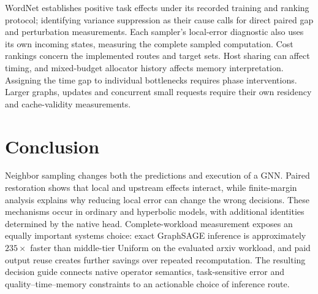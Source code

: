 \documentclass[sigconf, nonacm]{acmart}
\begin{document}
WordNet establishes positive task effects under its recorded training and ranking protocol; identifying variance suppression as their cause calls for direct paired gap and perturbation measurements. Each sampler's local-error diagnostic also uses its own incoming states, measuring the complete sampled computation. Cost rankings concern the implemented routes and target sets. Host sharing can affect timing, and mixed-budget allocator history affects memory interpretation. Assigning the time gap to individual bottlenecks requires phase interventions. Larger graphs, updates and concurrent small requests require their own residency and cache-validity measurements.

\section{Conclusion}
Neighbor sampling changes both the predictions and execution of a GNN. Paired restoration shows that local and upstream effects interact, while finite-margin analysis explains why reducing local error can change the wrong decisions. These mechanisms occur in ordinary and hyperbolic models, with additional identities determined by the native head. Complete-workload measurement exposes an equally important systems choice: exact GraphSAGE inference is approximately $235\times$ faster than middle-tier Uniform on the evaluated arxiv workload, and paid output reuse creates further savings over repeated recomputation. The resulting decision guide connects native operator semantics, task-sensitive error and quality--time--memory constraints to an actionable choice of inference route.



\end{document}
